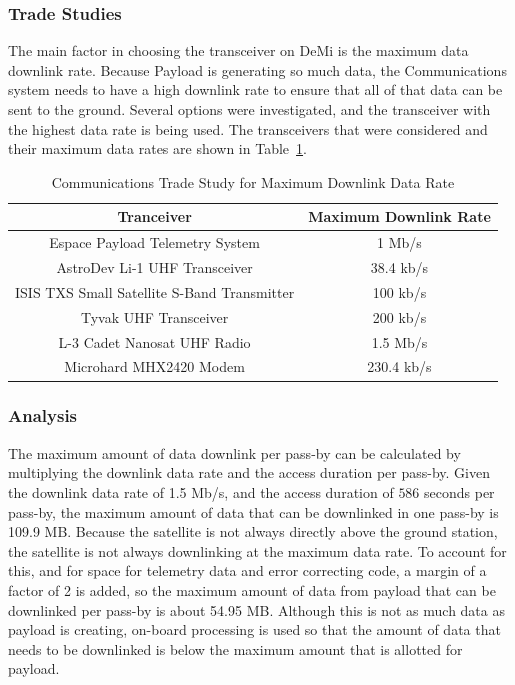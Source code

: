 \documentclass[12pt]{article}
\begin{document}
\subsubsection{Trade Studies} \label{sec:communications-trade-studies}

The main factor in choosing the transceiver on DeMi is the maximum data downlink rate. Because Payload is generating so much data, the Communications system needs to have a high downlink rate to ensure that all of that data can be sent to the ground. Several options were investigated, and the transceiver with the highest data rate is being used. The transceivers that were considered and their maximum data rates are shown in Table~\ref{table:comm_transceivers}.

\begin{table}[ht]
\caption{Communications Trade Study for Maximum Downlink Data Rate}
\begin{center}
    \begin{tabular}{| c | c |} \hline
    	\textbf{Tranceiver} & \textbf{Maximum Downlink Rate} \\ \hline \hline
Espace Payload Telemetry System & 1 Mb/s \\
AstroDev Li-1 UHF Transceiver & 38.4 kb/s \\
ISIS TXS Small Satellite  S-Band Transmitter & 100 kb/s \\
Tyvak UHF Transceiver & 200 kb/s \\
L-3 Cadet Nanosat UHF Radio & 1.5 Mb/s \\
Microhard MHX2420 Modem & 230.4 kb/s \\ \hline 
    \end{tabular}\label{table:comm_transceivers}
\end{center}
\end{table}

			\subsubsection{Analysis}

The maximum amount of data downlink per pass-by can be calculated by multiplying the downlink data rate and the access duration per pass-by. Given the downlink data rate of 1.5 Mb/s, and the access duration of $586$ seconds per pass-by, the maximum amount of data that can be downlinked in one pass-by is 109.9 MB. Because the satellite is not always directly above the ground station, the satellite is not always downlinking at the maximum data rate. To account for this, and for space for telemetry data and error correcting code, a margin of a factor of 2 is added, so the maximum amount of data from payload that can be downlinked per pass-by is about 54.95 MB. Although this is not as much data as payload is creating, on-board processing is used so that the amount of data that needs to be downlinked is below the maximum amount that is allotted for payload.
\end{document}
